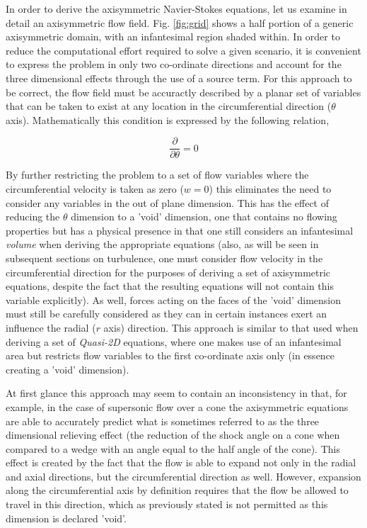 \indent In order to derive the axisymmetric Navier-Stokes equations, let us examine 
in detail an axisymmetric flow field. Fig. \ref{fig:grid} shows a half portion of a
generic axisymmetric domain, with an infantesimal region shaded within.  In order to reduce the 
computational effort required to solve a given scenario, it is convenient to express the problem 
in only two co-ordinate directions and account for the three dimensional effects through the use of
a source term.  For this approach to be correct, the flow field must be accuractly described
by a planar set of variables that can be taken to exist at any location in the circumferential
direction ($\theta$ axis).  Mathematically this condition is expressed by the following relation,

\begin{equation}
	\frac{\partial}{\partial \theta}=0 
\label{eqn:dtheta}
\end{equation}

	By further restricting the problem to a set of flow variables where the circumferential
velocity is taken as zero ($w = 0$) this eliminates the need to consider any variables in the out of plane 
dimension.  This has the effect of reducing the $\theta$ dimension to a 'void'
dimension, one that contains no flowing properties but has a physical presence in that one still
considers an infantesimal \emph{volume} when deriving the appropriate equations (also, as
will be seen in subsequent sections on turbulence, one must consider flow velocity in 
the circumferential direction for the purposes of deriving a set of axisymmetric equations,
despite the fact that the resulting equations will not contain this variable explicitly).  As well,
forces acting on the faces of the 'void' dimension must still be carefully considered as they
can in certain instances exert an influence the radial ($r$ axis) direction.  This approach is 
similar to that used when deriving a set of \emph{Quasi-2D} equations, where one makes use of 
an infantesimal	area but restricts flow variables to the first co-ordinate axis only (in essence 
creating a 'void' dimension).

	At first glance this approach may seem to contain an inconsistency in that, for example, 
in the case of supersonic flow over a cone the axisymmetric equations are able to accurately predict 
what is sometimes referred to as the three dimensional relieving effect (the reduction of the 
shock angle on a cone when compared to a wedge with an angle equal to the half angle of the cone). 
This effect is created by the fact that the flow is able to expand not only in the radial and 
axial directions, but the circumferential direction as well.  However, expansion along the 
circumferential axis by definition requires that the flow be allowed to travel in this direction, 
which as previously stated is not permitted as this dimension is declared 'void'.  

